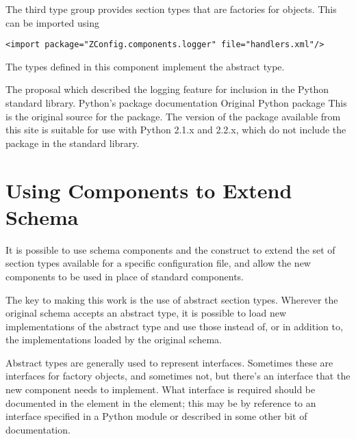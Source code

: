 \documentclass{howto}
\newcommand{\datatype}[1]{\strong{#1}}
\begin{document}
The third type group provides section types that are factories for
 objects.  This can be imported using

\begin{verbatim}
<import package="ZConfig.components.logger" file="handlers.xml"/>
\end{verbatim}

The types defined in this component implement the
\datatype{ZConfig.logger.handler} abstract type.



\begin{seealso}
         {The proposal which described the logging feature for
          inclusion in the Python standard library.}
          {Python's  package documentation}
          {}
          {Original Python  package}
          {This is the original source for the 
           package.  The version of the package available from this
           site is suitable for use with Python 2.1.x and 2.2.x, which
           do not include the  package in the standard
           library.}
\end{seealso}


\section{Using Components to Extend Schema}


It is possible to use schema components and the 
construct to extend the set of section types available for a specific
configuration file, and allow the new components to be used in place
of standard components.

The key to making this work is the use of abstract section types.
Wherever the original schema accepts an abstract type, it is possible
to load new implementations of the abstract type and use those instead
of, or in addition to, the implementations loaded by the original
schema.

Abstract types are generally used to represent interfaces.  Sometimes
these are interfaces for factory objects, and sometimes not, but
there's an interface that the new component needs to implement.  What
interface is required should be documented in the
 element in the  element;
this may be by reference to an interface specified in a Python module
or described in some other bit of documentation.
\end{document}
